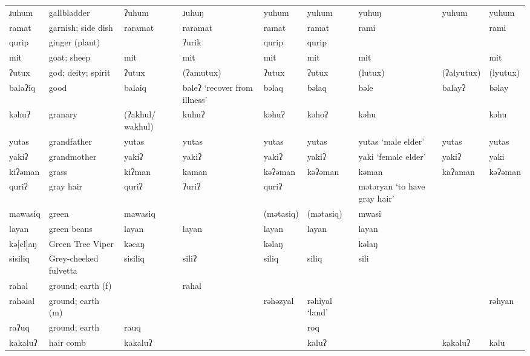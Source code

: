 \begin{landscape}
\begin{longtable}{*{9}{>{\raggedright\arraybackslash}p{}}}
\text{*}ɹuhum        & gallbladder & ʔuhum & ɹuhuŋ & yuhum & yuhum & yuhuŋ & yuhum & yuhum\\
\text{*}ramat        & garnish; side dish & raramat & raramat & ramat & ramat & rami &  & rami\\
\text{*}qurip        & ginger (plant) &  & ʔurik & qurip & qurip &  &  & \\
\text{*}mit          & goat; sheep & mit & mit & mit & mit & mit &  & mit\\
\text{*}ʔutux        & god; deity; spirit & ʔutux & (ʔamutux) & ʔutux & ʔutux & (lutux) & (ʔalyutux) & (lyutux)\\
\text{*}balaʔiq      & good & balaiq & baleʔ `recover from illness' & bəlaq & bəlaq & bəle & balayʔ & bəlay\\
\text{*}kəhuʔ        & granary & (ʔakhul/ \newline wakhul) & kuhuʔ & kəhuʔ & kəhoʔ & kəhu &  & kəhu\\
\text{*}yutas        & grandfather & yutas & yutas & yutas & yutas & yutas \newline `male elder' & yutas & yutas\\
\text{*}yakiʔ        & grandmother & yakiʔ & yakiʔ & yakiʔ & yakiʔ & yaki \newline `female elder' & yakiʔ & yaki\\
\text{*}kiʔəman      & grass & kiʔman & kaman & kəʔəman & kəʔəman & kəman & kaʔaman & kəʔəman\\
\text{*}quriʔ        & gray hair & quriʔ & ʔuriʔ & quriʔ &  & mətəryan \newline `to have gray hair' &  & \\
\text{*}mawasiq      & green & mawasiq &  & (mətasiq) & (mətasiq) & mwasi &  & \\
\text{*}layan        & green beans & layan & layan & layan & layan & layan &  & \\
\text{*}kə[cl]aŋ     & Green Tree Viper & kəcaŋ &  & kəlaŋ &  & kəlaŋ &  & \\
\text{*}sisiliq      & Grey-cheeked fulvetta & sisiliq & siliʔ & siliq & siliq & sili &  & \\
\text{*}rahal        & ground; earth (f) &  & rahal &  &  &  &  & \\
\text{*}rahəɹal      & ground; earth (m) &  &  & rəhəzyal & rəhiyal `land' &  &  & rəhyan\\
\text{*}raʔuq        & ground; earth & rauq &  &  & roq &  &  & \\
\text{*}kakaluʔ      & hair comb & kakaluʔ &  &  & kaluʔ &  & kakaluʔ & kalu\\

\end{longtable}
\end{landscape}
